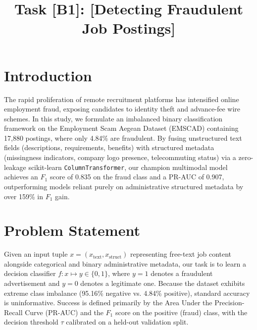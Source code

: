 \documentclass[conference]{IEEEtran}
\begin{document}
\title{Task [B1]: [Detecting Fraudulent Job Postings]}

\author{
}

\maketitle

\section{Introduction}
The rapid proliferation of remote recruitment platforms has intensified online employment fraud, exposing candidates to identity theft and advance-fee wire schemes. In this study, we formulate an imbalanced binary classification framework on the Employment Scam Aegean Dataset (EMSCAD) containing 17,880 postings, where only 4.84\% are fraudulent. By fusing unstructured text fields (descriptions, requirements, benefits) with structured metadata (missingness indicators, company logo presence, telecommuting status) via a zero-leakage scikit-learn \texttt{ColumnTransformer}, our champion multimodal model achieves an $F_1$ score of 0.835 on the fraud class and a PR-AUC of 0.907, outperforming models reliant purely on administrative structured metadata by over 159\% in $F_1$ gain.

\section{Problem Statement}
Given an input tuple $x = (x_{\text{text}}, x_{\text{struct}})$ representing free-text job content alongside categorical and binary administrative metadata, our task is to learn a decision classifier $f: x \mapsto y \in \{0, 1\}$, where $y=1$ denotes a fraudulent advertisement and $y=0$ denotes a legitimate one. Because the dataset exhibits extreme class imbalance (95.16\% negative vs. 4.84\% positive), standard accuracy is uninformative. Success is defined primarily by the Area Under the Precision-Recall Curve (PR-AUC) and the $F_1$ score on the positive (fraud) class, with the decision threshold $\tau$ calibrated on a held-out validation split.
\end{document}
